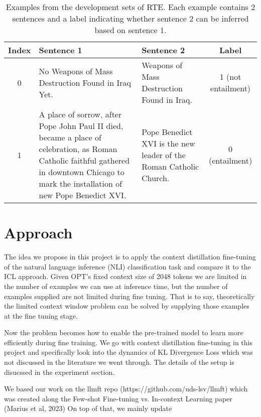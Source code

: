 \documentclass[10pt,twocolumn,letterpaper]{article}
\begin{document}
\begin{table*}
   \begin{center}
   \begin{tabular}{|c|p{6cm}|p{6cm}|c|}
   \hline
   Index & Sentence 1 & Sentence 2 & Label \\
   \hline
   0 & No Weapons of Mass Destruction Found in Iraq Yet. & Weapons of Mass Destruction Found in Iraq. &  1 (not entailment)\\
   \hline
   1 & A place of sorrow, after Pope John Paul II died, became a place of celebration, as Roman Catholic faithful gathered in downtown Chicago to mark the installation of new Pope Benedict XVI. & Pope Benedict XVI is the new leader of the Roman Catholic Church. & 0 (entailment) \\
   \hline
   \end{tabular}
   \end{center}
   \caption{Examples from the development sets of RTE. Each example contains 2 sentences and a label indicating whether sentence 2 can be inferred based on sentence 1.}
   \label{tab:contributions}
\end{table*}
\section{Approach}

The idea we propose in this project is to apply the context distillation fine-tuning of
the natural language inference (NLI) classification task and compare it to the ICL approach. Given OPT’s fixed context size of 2048 tokens we are limited in the number of examples we can use at inference time, but the number of examples supplied are not limited during fine tuning. That is to say,  theoretically the limited context window problem can be solved by supplying those examples at the fine tuning stage. 

Now the problem becomes how to enable the  pre-trained model to learn more efficiently during fine training. We go with context distillation fine-tuning in this project and specifically look into the dynamics of KL Divergence Loss which was not discussed in the literature we went through. The details of the setup is disucssed in the experiment section.

We based our work on the llmft repo (https://github.com/uds-lsv/llmft) which was created along the Few-shot Fine-tuning vs. In-context Learning paper (Marius et al, 2023) 
On top of that, we mainly update 
\end{document}
